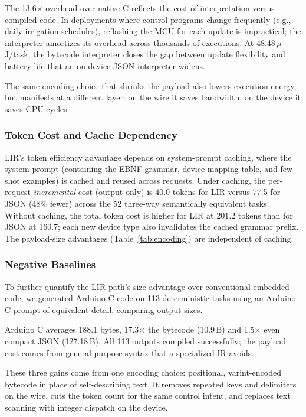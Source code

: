 \documentclass[a4paper,fleqn,longmktitle]{cas-dc}
\begin{document}
The 13.6$\times$ overhead over native C reflects the cost of interpretation versus compiled code. In deployments where control programs change frequently (e.g., daily irrigation schedules), reflashing the MCU for each update is impractical; the interpreter amortizes its overhead across thousands of executions. At 48.48\,$\mu$J/task, the bytecode interpreter closes the gap between update flexibility and battery life that an on-device JSON interpreter widens.

The same encoding choice that shrinks the payload also lowers execution energy, but manifests at a different layer: on the wire it saves bandwidth, on the device it saves CPU cycles.

\subsubsection{Token Cost and Cache Dependency}
\label{sec:cache_analysis}

LIR's token efficiency advantage depends on system-prompt caching, where the system prompt (containing the EBNF grammar, device mapping table, and few-shot examples) is cached and reused across requests. Under caching, the per-request \emph{incremental} cost (output only) is 40.0 tokens for LIR versus 77.5 for JSON (48\% fewer) across the 52 three-way semantically equivalent tasks. Without caching, the total token cost is higher for LIR at 201.2 tokens than for JSON at 160.7; each new device type also invalidates the cached grammar prefix. The payload-size advantages (Table~\ref{tab:encoding}) are independent of caching.

\subsubsection{Negative Baselines}
\label{sec:res_arduino}

To further quantify the LIR path's size advantage over conventional embedded code, we generated Arduino C code on 113 deterministic tasks using an Arduino C prompt of equivalent detail, comparing output sizes.

Arduino C averages 188.1 bytes, 17.3$\times$ the bytecode (10.9\,B) and 1.5$\times$ even compact JSON (127.18\,B). All 113 outputs compiled successfully; the payload cost comes from general-purpose syntax that a specialized IR avoids.

These three gains come from one encoding choice: positional, varint-encoded bytecode in place of self-describing text. It removes repeated keys and delimiters on the wire, cuts the token count for the same control intent, and replaces text scanning with integer dispatch on the device.
\end{document}

